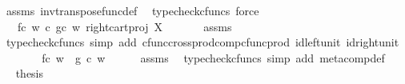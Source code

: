 \begin{isabellebody}
\ assms\ inv{\isacharunderscore}{\kern0pt}transpose{\isacharunderscore}{\kern0pt}func{\isacharunderscore}{\kern0pt}def{}\ \isamarkupfalse%
\ {\isacharparenleft}{\kern0pt}typecheck{\isacharunderscore}{\kern0pt}cfuncs{\isacharcomma}{\kern0pt}\ force{\isacharparenright}{\kern0pt}\isanewline
\ \ \isamarkupfalse%
\ \isamarkupfalse%
\ {\isachardoublequoteopen}{\isachardot}{\kern0pt}{\isachardot}{\kern0pt}{\isachardot}{\kern0pt}\ {\isacharequal}{\kern0pt}\ {\isacharparenleft}{\kern0pt}{\isacharparenleft}{\kern0pt}f{\isasymcirc}\isactrlsub c\ w{\isacharparenright}{\kern0pt}\isactrlsup {\isasymflat}\ {\isasymcirc}\isactrlsub c\ {\isasymlangle}{\isacharparenleft}{\kern0pt}g{\isasymcirc}\isactrlsub c\ w{\isacharparenright}{\kern0pt}\isactrlsup {\isasymflat}{\isacharcomma}{\kern0pt}\ right{\isacharunderscore}{\kern0pt}cart{\isacharunderscore}{\kern0pt}proj\ X\ {\isasymone}{\isasymrangle}{\isacharparenright}{\kern0pt}\isactrlsup {\isasymsharp}{\isachardoublequoteclose}\isanewline
\ \ \ \ \isamarkupfalse%
\ assms\ \isamarkupfalse%
\ {\isacharparenleft}{\kern0pt}typecheck{\isacharunderscore}{\kern0pt}cfuncs{\isacharcomma}{\kern0pt}\ simp\ add{\isacharcolon}{\kern0pt}\ cfunc{\isacharunderscore}{\kern0pt}cross{\isacharunderscore}{\kern0pt}prod{\isacharunderscore}{\kern0pt}comp{\isacharunderscore}{\kern0pt}cfunc{\isacharunderscore}{\kern0pt}prod\ id{\isacharunderscore}{\kern0pt}left{\isacharunderscore}{\kern0pt}unit{}\ id{\isacharunderscore}{\kern0pt}right{\isacharunderscore}{\kern0pt}unit{}{\isacharparenright}{\kern0pt}\isanewline
\ \ \isamarkupfalse%
\ \isamarkupfalse%
\ {\isachardoublequoteopen}{\isachardot}{\kern0pt}{\isachardot}{\kern0pt}{\isachardot}{\kern0pt}\ {\isacharequal}{\kern0pt}\ {\isacharparenleft}{\kern0pt}f{\isasymcirc}\isactrlsub c\ w{\isacharparenright}{\kern0pt}\ {\isasymbox}\ {\isacharparenleft}{\kern0pt}g\ {\isasymcirc}\isactrlsub c\ w{\isacharparenright}{\kern0pt}{\isachardoublequoteclose}\isanewline
\ \ \ \ \isamarkupfalse%
\ assms\ \isamarkupfalse%
\ {\isacharparenleft}{\kern0pt}typecheck{\isacharunderscore}{\kern0pt}cfuncs{\isacharcomma}{\kern0pt}\ simp\ add{\isacharcolon}{\kern0pt}\ meta{\isacharunderscore}{\kern0pt}comp{}{\isacharunderscore}{\kern0pt}def{}{\isacharparenright}{\kern0pt}\isanewline
\ \ \isamarkupfalse%
\ \isamarkupfalse%
\ {\isacharquery}{\kern0pt}thesis\isacommand{{\isachardot}{\kern0pt}}\isamarkupfalse%

\end{isabellebody}
